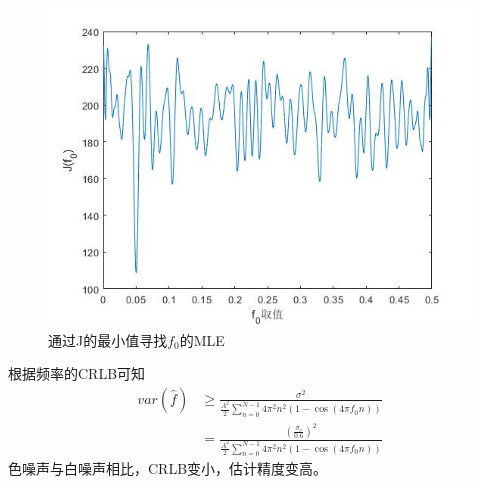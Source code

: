 \documentclass[fontset=windows]{article}
\numberwithin{figure}{section}
\begin{document}
\begin{figure}[H]
	\centering
	\includegraphics[scale=0.5]{fig4.jpg}
	\caption{通过J的最小值寻找\(f_0\)的MLE}
	\label{2.4}
\end{figure}

根据频率的CRLB可知
\begin{align*}
	var(\hat{f}) & \geq\frac{\sigma^2}
	{\frac{A^2}{2}\sum_{n=0}^{N-1}4\pi^2n^2(1-\cos(4\pi f_0 n))} \\
	             & =\frac{(\frac{\sigma_e}{0.6})^2}
	{\frac{A^2}{2}\sum_{n=0}^{N-1}4\pi^2n^2(1-\cos(4\pi f_0 n))}
\end{align*}
色噪声与白噪声相比，CRLB变小，估计精度变高。


\end{document}
